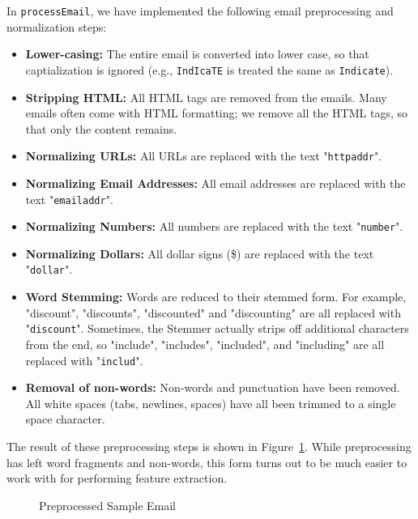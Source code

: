 \documentclass[12pt]{article}
\begin{document}
In \texttt{processEmail}, we have implemented the following email preprocessing and normalization steps:

\begin{itemize}
  \item \textbf{Lower-casing:} The entire email is converted into lower case, so   that captialization is ignored (e.g., \texttt{IndIcaTE} is treated the same as   \texttt{Indicate}).
  \item \textbf{Stripping HTML:} All HTML tags are removed from the emails.   Many emails often come with HTML formatting; we remove all the   HTML tags, so that only the content remains.
  \item \textbf{Normalizing URLs:} All URLs are replaced with the text "\texttt{httpaddr}".
  \item \textbf{Normalizing Email Addresses:} All email addresses are replaced  with the text "\texttt{emailaddr}".
  \item \textbf{Normalizing Numbers:} All numbers are replaced with the text "\texttt{number}".
  \item \textbf{Normalizing Dollars:} All dollar signs (\$) are replaced with the text
  "\texttt{dollar}".
  \item \textbf{Word Stemming:} Words are reduced to their stemmed form. For example, "discount", "discounts", "discounted" and "discounting" are all   replaced with "\texttt{discount}". Sometimes, the Stemmer actually strips off additional characters from the end, so "include", "includes", "included", and "including" are all replaced with "\texttt{includ}".
  \item \textbf{Removal of non-words:} Non-words and punctuation have been removed. All white spaces (tabs, newlines, spaces) have all been trimmed to a single space character.
\end{itemize}

The result of these preprocessing steps is shown in Figure~\ref{block:preprocessed}. While preprocessing has left word fragments and non-words, this form turns out to be much easier to work with for performing feature extraction.

\begin{figure}[h!]
  
  \caption{Preprocessed Sample Email}
  \label{block:preprocessed}
  \end{figure}
\end{document}
